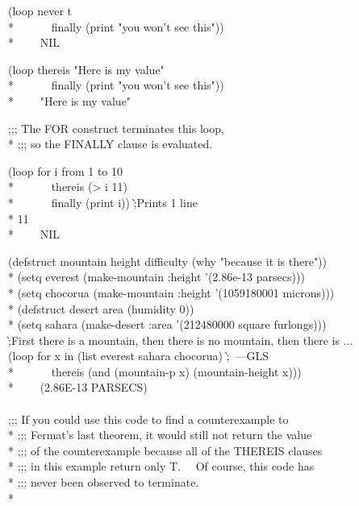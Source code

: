 \begin{new}
\begin{defloop}
\begin{lisp}
(loop never t \\*
~~~~~~finally (print "you won't see this")) \\*
~~~\EV~NIL
\end{lisp}
\begin{lisp}
(loop thereis "Here is my value" \\*
~~~~~~finally (print "you won't see this")) \\*
~~~\EV~"Here is my value"
\end{lisp}
\begin{lisp}
;;; The FOR construct terminates this loop, \\*
;;; so the FINALLY clause is evaluated.
\end{lisp}
\begin{lisp}
(loop for i from 1 to 10 \\*
~~~~~~thereis (> i 11) \\*
~~~~~~finally (print i)) \`;{\rm Prints 1 line}\\*
11 \\*
~~~\EV~NIL
\end{lisp}
\goodbreak
\begin{lisp}
(defstruct mountain height difficulty (why "because it is there")) \\*
(setq everest (make-mountain :height '(2.86e-13 parsecs))) \\*
(setq chocorua (make-mountain :height '(1059180001 microns))) \\*
(defstruct desert area (humidity 0)) \\*
(setq sahara (make-desert :area '(212480000 square furlongs))) \\
\`;{\rm First there is a mountain, then there is no mountain, then there is $\ldots$} \\
(loop for x in (list everest sahara chocorua) \`;~{\rm ---GLS} \\*
~~~~~~thereis (and (mountain-p x) (mountain-height x))) \\*
~~~\EV~(2.86E-13 PARSECS) \\
 \\
;;; If you could use this code to find a counterexample to \\*
;;; Fermat's last theorem, it would still not return the value \\*
;;; of the counterexample because all of the THEREIS clauses \\*
;;; in this example return only T.~~ Of course, this code has \\*
;;; never been observed to terminate. \\*

\end{lisp}
\end{defloop}
\end{new}
